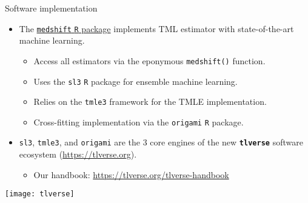 \documentclass{beamer}
\begin{document}

\begin{frame}[c]{Software implementation}

\begin{center}
\begin{itemize}
  \itemsep2pt
  \item The \underline{\texttt{medshift} \texttt{R} package}
    \citep{hejazi2019medshift} implements TML estimator with state-of-the-art
    machine learning.
    \begin{itemize}
      \item Access all estimators via the eponymous \texttt{medshift()}
        function.
      \item Uses the \texttt{sl3} \texttt{R} package for ensemble machine
        learning.
      \item Relies on the \texttt{tmle3} framework for the TMLE implementation.
      \item Cross-fitting implementation via the \texttt{origami} \texttt{R}
        package.
    \end{itemize}
  \item \texttt{sl3}, \texttt{tmle3}, and \texttt{origami} are the 3 core
    engines of the new \textbf{\texttt{tlverse}} software ecosystem
    (\url{https://tlverse.org}).
    \begin{itemize}
      \item Our handbook: \url{https://tlverse.org/tlverse-handbook}
    \end{itemize}
\end{itemize}
\texttt{[image: tlverse]}
\end{center}

\note{
}

\end{frame}


\setbeamercovered{}
\beamerdefaultoverlayspecification{}

\begin{frame}[c,allowframebreaks]{}

\scriptsize



\end{frame}

\end{document}
